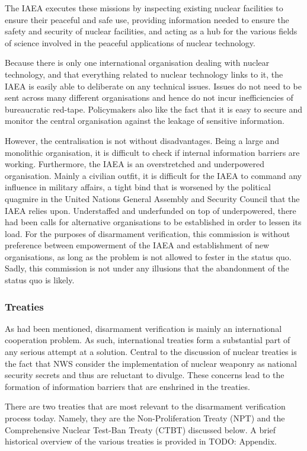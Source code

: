 \documentclass[twoside,titlepage,11pt,twocolumn,a4paper]{article}
\begin{document}
The IAEA executes these missions by inspecting existing nuclear
facilities to ensure their peaceful and safe use, providing
information needed to ensure the safety and security of nuclear
facilities, and acting as a hub for the various fields of science
involved in the peaceful applications of nuclear technology.

Because there is only one international organisation dealing with
nuclear technology, and that everything related to nuclear technology
links to it, the IAEA is easily able to deliberate on any technical
issues. Issues do not need to be sent across many different
organisations and hence do not incur inefficiencies of bureaucratic
red-tape. Policymakers also like the fact that it is easy to secure
and monitor the central organisation against the leakage of sensitive
information.

However, the centralisation is not without disadvantages. Being a
large and monolithic organisation, it is difficult to check if
internal information barriers are working. Furthermore, the IAEA is an
overstretched and underpowered organisation. Mainly a civilian outfit,
it is difficult for the IAEA to command any influence in military
affairs, a tight bind that is worsened by the political quagmire in
the United Nations General Assembly and Security Council that the IAEA
relies upon. Understaffed and underfunded on top of underpowered,
there had been calls for alternative organisations to be established
in order to lessen its load. For the purposes of disarmament
verification, this commission is without preference between
empowerment of the IAEA and establishment of new organisations, as
long as the problem is not allowed to fester in the status quo. Sadly,
this commission is not under any illusions that the abandonment of the
status quo is likely.

\subsubsection{Treaties}
As had been mentioned, disarmament verification is mainly an
international cooperation problem. As such, international treaties
form a substantial part of any serious attempt at a solution. Central
to the discussion of nuclear treaties is the fact that NWS consider
the implementation of nuclear weaponry as national security secrets
and thus are reluctant to divulge. These concerns lead to the
formation of information barriers that are enshrined in the treaties.

There are two treaties that are most relevant to the disarmament
verification process today. Namely, they are the Non-Proliferation
Treaty (NPT) and the Comprehensive Nuclear Test-Ban Treaty (CTBT)
discussed below. A brief historical overview of the various treaties
is provided in TODO: Appendix.
\end{document}
